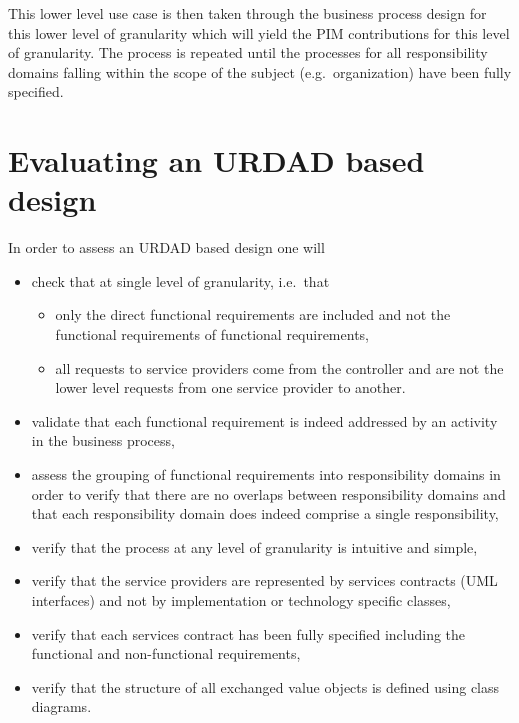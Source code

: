 \documentclass[reviewcopy]{elsart}
\begin{document}
This lower level use case is then taken through the business process design for this
lower level of granularity which will yield the PIM contributions for this level of granularity.
The process is repeated until the processes for all responsibility domains falling within
the scope of the subject (e.g.\ organization) have been fully specified.


\section{Evaluating an URDAD based design}

In order to assess an URDAD based design one will
\begin{itemize}
   \item check that at single level of granularity, i.e.\ that
   \begin{itemize}
		\item only the direct functional requirements are included and not the functional requirements
				of functional requirements,
		\item all requests to service providers come from the controller and are not the lower level
				requests from one service provider to another.
   \end{itemize}
   \item validate that each functional requirement is indeed addressed by an activity in the business process,
   \item assess the grouping of functional requirements into responsibility domains in
             order to verify that there are no overlaps between responsibility domains and that
             each responsibility domain does indeed comprise a single responsibility,
    \item verify that the process at any level of granularity is intuitive and simple,
    \item verify that the service providers are represented by services contracts (UML interfaces) and 
              not by implementation or technology specific classes,
    \item verify that each services contract has been fully specified including the functional and
              non-functional requirements,
    \item verify that the structure of all exchanged value objects is defined using class diagrams.
\end{itemize}
\end{document}

